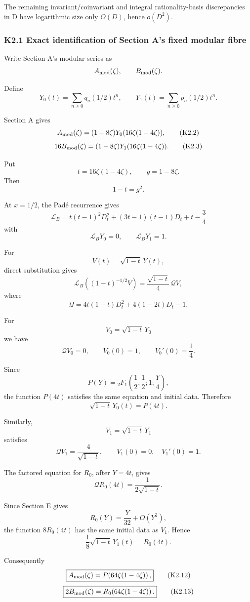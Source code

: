 \documentclass[
  10pt,
  letterpaper,
]{article}
\theoremstyle{definition}
\theoremstyle{remark}
\begin{document}
The remaining invariant/coinvariant and integral rationality-basis
discrepancies in D have logarithmic size only \(O(D)\), hence
\(o(D^2)\).

\subsubsection{K2.1 Exact identification of Section A's fixed modular
fibre}\label{k2.1-exact-identification-of-section-as-fixed-modular-fibre}

Write Section A's modular series as \[
A_{\rm mod}(\zeta),\qquad B_{\rm mod}(\zeta).
\]

Define \[
Y_0(t)=\sum_{n\ge0}q_n(1/2)t^n,
\qquad
Y_1(t)=\sum_{n\ge0}p_n(1/2)t^n.
\]

Section A gives \[
A_{\rm mod}(\zeta)
=(1-8\zeta)Y_0(16\zeta(1-4\zeta)),
\tag{K2.2}
\] \[
16B_{\rm mod}(\zeta)
=(1-8\zeta)Y_1(16\zeta(1-4\zeta)).
\tag{K2.3}
\]

Put \[
t=16\zeta(1-4\zeta),\qquad g=1-8\zeta.
\] Then \[
1-t=g^2.
\tag{K2.4}
\]

At \(x=1/2\), the Padé recurrence gives \[
\mathscr L_B
=
t(t-1)^2D_t^2
+(3t-1)(t-1)D_t
+t-\frac34
\] with \[
\mathscr L_BY_0=0,\qquad
\mathscr L_BY_1=1.
\tag{K2.5}
\]

For \[
V(t)=\sqrt{1-t}\,Y(t),
\] direct substitution gives \[
\mathscr L_B((1-t)^{-1/2}V)
=
\frac{\sqrt{1-t}}4\,\mathscr QV,
\tag{K2.6}
\] where \[
\mathscr Q
=
4t(1-t)D_t^2
+4(1-2t)D_t
-1.
\tag{K2.7}
\]

For \[
V_0=\sqrt{1-t}\,Y_0
\] we have \[
\mathscr QV_0=0,\qquad
V_0(0)=1,\qquad
V_0'(0)=\frac14.
\]

Since \[
P(Y)
={}_2F_1\!\left(\frac12,\frac12;1;\frac Y4\right),
\] the function \(P(4t)\) satisfies the same equation and initial data.
Therefore \[
\boxed{
\sqrt{1-t}\,Y_0(t)=P(4t).
}
\tag{K2.8}
\]

Similarly, \[
V_1=\sqrt{1-t}\,Y_1
\] satisfies \[
\mathscr QV_1=\frac4{\sqrt{1-t}},
\qquad
V_1(0)=0,\quad V_1'(0)=1.
\tag{K2.9}
\]

The factored equation for \(R_0\), after \(Y=4t\), gives \[
\mathscr Q R_0(4t)=\frac1{2\sqrt{1-t}}.
\tag{K2.10}
\]

Since Section E gives \[
R_0(Y)=\frac Y{32}+O(Y^2),
\] the function \(8R_0(4t)\) has the same initial data as \(V_1\). Hence
\[
\boxed{
\frac18\sqrt{1-t}\,Y_1(t)=R_0(4t).
}
\tag{K2.11}
\]

Consequently \[
\boxed{
A_{\rm mod}(\zeta)
=
P\!\left(64\zeta(1-4\zeta)\right),
}
\tag{K2.12}
\] \[
\boxed{
2B_{\rm mod}(\zeta)
=
R_0\!\left(64\zeta(1-4\zeta)\right).
}
\tag{K2.13}
\]
\end{document}
